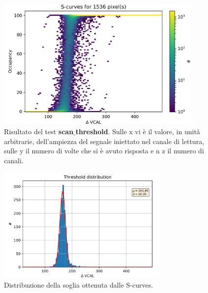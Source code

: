 \begin{figure}
\centering
\includegraphics[width=0.9\textwidth]{Immagini/Scurves}
\caption{Risultato del test \textbf{scan$\_$threshold}. Sulle x vi è il valore, in unità arbitrarie, dell'ampiezza del segnale iniettato nel canale di lettura, sulle y il numero di volte che si è avuto risposta e n z il numero di canali.}
\label{Scurves}
\end{figure}
\begin{figure}
\centering
\includegraphics[width=0.75\textwidth]{Immagini/Threshold}
\caption{Distribuzione della soglia ottenuta dalle S-curves.}
\label{Threshold}
\end{figure}

